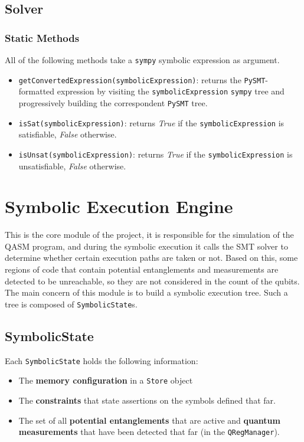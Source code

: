 \documentclass[12pt,a4paper]{report}
\theoremstyle{definition}
\theoremstyle{definition}
\theoremstyle{definition}
\begin{document}
\subsection{Solver}
\subsubsection{Static Methods}
All of the following methods take a \texttt{sympy} symbolic expression as argument.
\begin{itemize}
    \itemsep 0em
    \item \texttt{getConvertedExpression(symbolicExpression)}: returns the \texttt{PySMT}-formatted expression by visiting the \texttt{symbolicExpression} \texttt{sympy} tree and progressively building the correspondent \texttt{PySMT} tree.
    \item \texttt{isSat(symbolicExpression)}: returns \textit{True} if the \texttt{symbolicExpression} is satisfiable, \textit{False} otherwise.
    \item \texttt{isUnsat(symbolicExpression)}: returns \textit{True} if the \texttt{symbolicExpression} is unsatisfiable, \textit{False} otherwise.
\end{itemize}


\section{Symbolic Execution Engine}
This is the core module of the project, it is responsible for the simulation of the QASM program, and during the symbolic execution it calls the SMT solver to determine whether certain execution paths are taken or not. Based on this, some regions of code that contain potential entanglements and measurements are detected to be unreachable, so they are not considered in the count of the qubits.
The main concern of this module is to build a symbolic execution tree. Such a tree is composed of \texttt{SymbolicState}s.

\subsection{SymbolicState}
Each \texttt{SymbolicState} holds the following information:
\begin{itemize}
    \itemsep 0em
    \item The \textbf{memory configuration} in a \texttt{Store} object
    \item The \textbf{constraints} that state assertions on the symbols defined that far.
    \item The set of all \textbf{potential entanglements} that are active and \textbf{quantum measurements} that have been detected that far (in the \texttt{QRegManager}).
\end{itemize}
\end{document}

